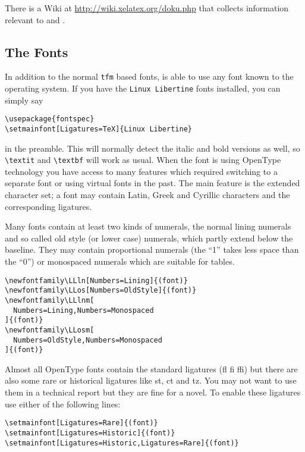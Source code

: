 There is a Wiki at \url{http://wiki.xelatex.org/doku.php} that collects
information relevant to  and .

\subsection{The Fonts}\label{sec:fontspec}

In addition to the normal \texttt{tfm} based fonts,  is able
to use any font known to the operating system. If you have the \texttt{Linux
  Libertine} fonts installed, you can simply say

\begin{code}
\begin{verbatim}
\usepackage{fontspec}
\setmainfont[Ligatures=TeX]{Linux Libertine}
\end{verbatim}
\end{code}
%
in the preamble. This will normally detect the italic and bold versions as
well, so \verb|\textit| and \verb|\textbf| will work as usual. When the
font is using OpenType technology you have access to many features which
required switching to a separate font or using virtual fonts in the past.
The main feature is the extended character set; a font may contain Latin,
Greek and Cyrillic characters and the corresponding ligatures.

Many fonts contain at least two kinds of numerals, the normal lining
numerals and so called old style (or lower case) numerals, which partly
extend below the baseline. They may contain proportional numerals (the ``1''
takes less space than the ``0'') or monospaced numerals which are suitable
for tables.

\begin{code}
\begin{verbatim}
\newfontfamily\LLln[Numbers=Lining]{(font)}
\newfontfamily\LLos[Numbers=OldStyle]{(font)}
\newfontfamily\LLlnm[
  Numbers=Lining,Numbers=Monospaced
]{(font)}
\newfontfamily\LLosm[
  Numbers=OldStyle,Numbers=Monospaced
]{(font)}
\end{verbatim}
\end{code}

Almost all OpenType fonts contain the standard ligatures (fl fi ffi) but
there are also some rare or historical ligatures like st, ct and tz. You may
not want to use them in a technical report but they are fine for a novel. To
enable these ligatures use either of the following lines:

\begin{code}
\begin{verbatim}
\setmainfont[Ligatures=Rare]{(font)}
\setmainfont[Ligatures=Historic]{(font)}
\setmainfont[Ligatures=Historic,Ligatures=Rare]{(font)}
\end{verbatim}
\end{code}


